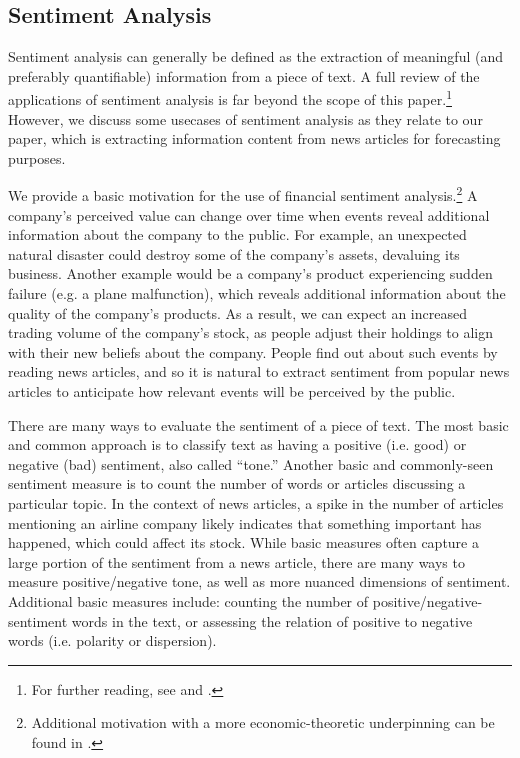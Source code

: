 \documentclass[12pt]{article}
\begin{document}
\subsection{Sentiment Analysis}
Sentiment analysis can generally be defined as the extraction of meaningful (and preferably quantifiable) information from a piece of text. A full review of the applications of sentiment analysis is far beyond the scope of this paper.\footnote{For further reading, see \textcite{mejova2009sentiment} and \textcite{wankhade2022survey}.} However, we discuss some usecases of sentiment analysis as they relate to our paper, which is extracting information content from news articles for forecasting purposes.

We provide a basic motivation for the use of financial sentiment analysis.\footnote{Additional motivation with a more economic-theoretic underpinning can be found in \textcite{kaplanski2010sentiment}.} A company's perceived value can change over time when events reveal additional information about the company to the public. For example, an unexpected natural disaster could destroy some of the company's assets, devaluing its business. Another example would be a company's product experiencing sudden failure (e.g. a plane malfunction), which reveals additional information about the quality of the company's products. As a result, we can expect an increased trading volume of the company's stock, as people adjust their holdings to align with their new beliefs about the company. People find out about such events by reading news articles, and so it is natural to extract sentiment from popular news articles to anticipate how relevant events will be perceived by the public. 

There are many ways to evaluate the sentiment of a piece of text. The most basic and common approach is to classify text as having a positive (i.e. good) or negative (bad) sentiment, also called ``tone.'' Another basic and commonly-seen sentiment measure is to count the number of words or articles discussing a particular topic. In the context of news articles, a spike in the number of articles mentioning an airline company likely indicates that something important has happened, which could affect its stock. While basic measures often capture a large portion of the sentiment from a news article, there are many ways to measure positive/negative tone, as well as more nuanced dimensions of sentiment. Additional basic measures include: counting the number of positive/negative-sentiment words in the text, or assessing the relation of positive to negative words (i.e. polarity or dispersion).
\end{document}
